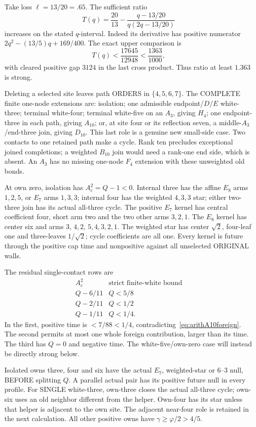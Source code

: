 \documentclass[11pt]{article}
\begin{document}
Take loss \(\ell=13/20=.65\).
The sufficient ratio
\[
 T(q)={\frac{20}{13}}
       -{\frac{q-13/20}{q(2q-13/20)}}
\]
increases on the stated \(q\)-interval.
Indeed its derivative has positive numerator
\(2q^2-(13/5)q+169/400\).
The exact upper comparison is
\[
 T(q)<{\frac{17645}{12948}}<{\frac{1363}{1000}},
\]
with cleared positive gap \(3124\) in the
last cross product.
Thus ratio at least \(1.363\) is strong.

Deleting a selected site leaves path ORDERS
in \(\{4,5,6,7\}\).
The COMPLETE finite one-node extensions are:
isolation; one admissible endpoint/\(D/E\)
white-three; terminal white-four; terminal
white-five on an \(A_3\), giving \(H_4\);
one endpoint-three in each path, giving
\(A_{10}\); or, at site four or its
reflection seven, a middle-\(A_3\)/end-three
join, giving \(D_{10}\).
This last role is a genuine new small-side
case.  Two contacts to one retained path
make a cycle.  Rank ten precludes exceptional
joined completions; a weighted \(B_{10}\)
join would need a rank-one end side, which
is absent.  An \(A_3\) has no missing
one-node \(F_4\) extension with these
unweighted old bonds.

At own zero, isolation has \(A_c^2=Q-1<0\).
Internal three has the affine \(E_8\) arms
\(1,2,5\), or \(E_7\) arms \(1,3,3\);
internal four has the weighted \(4,3,3\)
star; either two-three join has its actual
all-three cycle.
The positive \(E_7\) kernel has central
coefficient four, short arm two and the
two other arms \(3,2,1\).
The \(E_8\) kernel has center six and
arms \(3\), \(4,2\), \(5,4,3,2,1\).
The weighted star has center \(\sqrt2\),
four-leaf one and three-leaves \(1/\sqrt2\);
cycle coefficients are all one.
Every kernel is future through the positive
cap time and nonpositive against all
unselected ORIGINAL walls.

The residual single-contact rows are
\[
 \begin{array}{c|c}
 A_c^2&\text{strict finite-white bound}\\ \hline
 Q-6/11&Q<5/8\\
 Q-2/11&Q<1/2\\
 Q-1/11&Q<1/4 .
 \end{array}
\]
In the first, positive time is \(<7/88<1/4\),
contradicting~\eqref{eq:arithA10foreign}.
The second permits at most one whole
foreign contribution, larger than its time.
The third has \(Q=0\) and negative time.
The white-five/own-zero case will instead
be directly strong below.

Isolated owns three, four and six have
the actual \(E_7\), weighted-star or
\(6\)--\(3\) null, BEFORE splitting \(Q\).
A parallel actual pair has its positive
future null in every profile.
For SINGLE white-three, own-three closes
the actual all-three cycle; own-six uses
an old neighbor different from the helper.
Own-four has its star unless that helper
is adjacent to the own site.
The adjacent near-four role is retained
in the next calculation.
All other positive owns have
\(\gamma\ge\varphi/2>4/5\).
\end{document}
